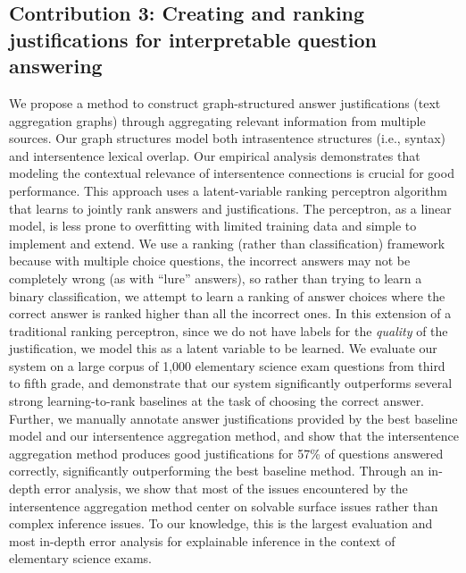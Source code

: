 \subsection{Contribution 3: Creating and ranking justifications for interpretable question answering} We propose a method to construct graph-structured answer justifications (text aggregation graphs) through aggregating relevant information from multiple sources.  Our graph structures model both intrasentence structures (i.e., syntax) and intersentence lexical overlap.
Our empirical analysis demonstrates that modeling the contextual relevance of intersentence connections is crucial for good performance.  %
This approach uses a latent-variable ranking perceptron algorithm that learns to jointly rank answers and justifications.  The perceptron, as a linear model, is less prone to overfitting with limited training data and simple to implement and extend.  We use a ranking (rather than classification) framework because with multiple choice questions, the incorrect answers may not be completely wrong (as with ``lure'' answers), so rather than trying to learn a binary classification, we attempt to learn a ranking of answer choices where the correct answer is ranked higher than all the incorrect ones.  In this extension of a traditional ranking perceptron, since we do not have labels for the  \emph{quality} of the justification, we model this as a latent variable to be learned. 
We evaluate our system on a large corpus of 1,000 elementary science exam questions from third to fifth grade, and demonstrate that our system significantly outperforms several strong learning-to-rank baselines at the task of choosing the correct answer.  Further, we manually annotate answer justifications provided by the best baseline model and our intersentence aggregation method, and show that the intersentence aggregation method produces good justifications for 57\% of questions answered correctly, significantly outperforming the best baseline method. 
Through an in-depth error analysis, we show that most of the issues encountered by the intersentence aggregation method center on solvable surface issues rather than complex inference issues.  To our knowledge, this is the largest evaluation and most in-depth error analysis for explainable inference in the context of elementary science exams. 


